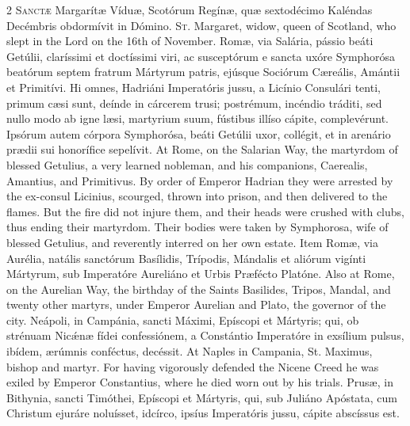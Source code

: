 \begin{paracol}{2}
\lettrine[lines=2]{S}{anctæ} Margarítæ Víduæ, 
 Scotórum Regínæ, quæ sextodécimo Kaléndas Decémbris obdormívit in Dómino.
\switchcolumn
{}
\lettrine[lines=2]{S}{t.} Margaret, widow, queen of 
 Scotland, who slept in the Lord on the 16th of November.
\switchcolumn*
{}
Romæ, via Salária, 
 pássio beáti Getúlii, claríssimi et doctíssimi viri, ac susceptórum e sancta 
 uxóre Symphorósa beatórum septem fratrum Mártyrum patris, ejúsque Sociórum 
 Cæreális, Amántii et Primitívi. Hi omnes, Hadriáni Imperatóris jussu, 
 a Licínio Consulári tenti, primum cæsi sunt, deínde in cárcerem trusi; 
 postrémum, incéndio tráditi, sed nullo modo ab igne læsi, martyrium suum, 
 fústibus illíso cápite, complevérunt. Ipsórum autem córpora Symphorósa, 
 beáti Getúlii uxor, collégit, et in arenário prædii sui honorífice sepelívit.
\switchcolumn
{}
At Rome, on the Salarian Way, the 
 martyrdom of blessed Getulius, a very learned nobleman, and his companions, 
 Caerealis, Amantius, and Primitivus. By order of Emperor Hadrian they 
 were arrested by the ex-consul Licinius, scourged, thrown into prison, and 
 then delivered to the flames. But the fire did not injure them, and 
 their heads were crushed with clubs, thus ending their martyrdom. 
 Their bodies were taken by Symphorosa, wife of blessed Getulius, and 
 reverently interred on her own estate.
\switchcolumn*
{}
Item Romæ, via Aurélia, natális sanctórum Basílidis, Trípodis, Mándalis et aliórum vigínti Mártyrum, 
 sub Imperatóre Aureliáno et Urbis Præfécto Platóne.
\switchcolumn
{}
Also at Rome, on the Aurelian Way, 
 the birthday of the Saints Basilides, Tripos, Mandal, and twenty other 
 martyrs, under Emperor Aurelian and Plato, the governor of the city.
\switchcolumn*
{}
Neápoli, in Campánia, 
 sancti Máximi, Epíscopi et Mártyris; qui, ob strénuam Nicǽnæ fídei 
 confessiónem, a Constántio Imperatóre in exsílium pulsus, ibídem, ærúmnis 
 conféctus, decéssit.
\switchcolumn
{}
At Naples in Campania, St. Maximus, 
 bishop and martyr. For having vigorously defended the Nicene Creed he 
 was exiled by Emperor Constantius, where he died worn out by his trials.
\switchcolumn*
{}
Prusæ, in Bithynia, 
 sancti Timóthei, Epíscopi et Mártyris, qui, sub Juliáno Apóstata, cum 
 Christum ejuráre noluísset, idcírco, ipsíus Imperatóris jussu, cápite 
 abscíssus est.
\switchcolumn
{}

\end{paracol}
